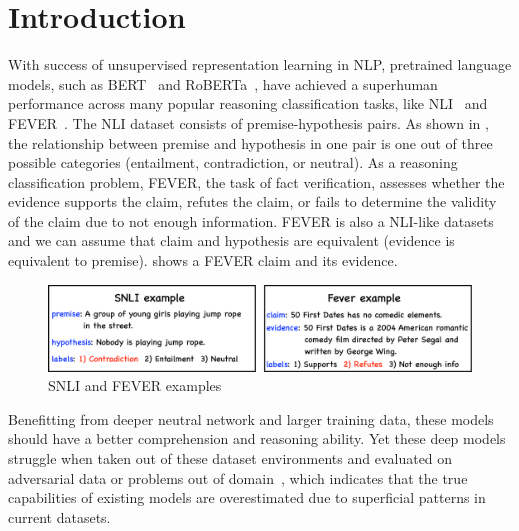 \section{Introduction}
\label{intro}

With success of unsupervised representation learning in NLP, pretrained language 
models, such as BERT~\cite{devlin2018bert} and RoBERTa~\cite{liu2019roberta}, 
have achieved a superhuman 
performance across many popular reasoning classification tasks, 
like NLI~\cite{bowman2015large,williams2018broad} and FEVER~\cite{thorne2018fever}. 
The NLI dataset consists of premise-hypothesis pairs. 
As shown in , the relationship between premise and hypothesis in one pair
is one out of three   
possible categories (entailment, contradiction, or neutral).
As a reasoning classification problem,
FEVER, the task of fact verification, 
assesses whether the evidence supports the claim, refutes the claim, 
or fails to determine the validity of the claim due to not enough information. 
FEVER is also a NLI-like datasets and we can assume 
that claim and hypothesis are equivalent (evidence is equivalent to premise).
 shows 
a FEVER claim and its evidence.

\begin{figure}[th!]
	\centering
	\includegraphics[width=0.9\columnwidth]{figures/noise_example.eps}
	\caption{SNLI and FEVER examples}
	\label{fig:example}
\end{figure}

Benefitting from deeper neutral 
network and larger training data, these models should have a better comprehension 
and reasoning ability. Yet these deep models struggle when taken out of these dataset environments and evaluated
on adversarial data or problems out of domain~\cite{naik2018stress,mccoy2019right,schuster2019towards,nie2019adversarial},
which indicates that the true capabilities of existing models are overestimated due to superficial patterns in current datasets. 

